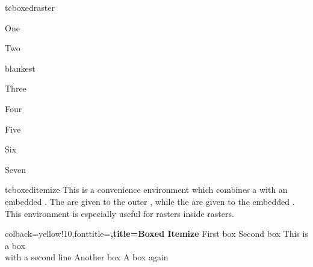 \begin{docEnvironment}[doc new=2016-02-19]{tcboxedraster}{}
\begin{dispExample}
\begin{tcbraster}[raster columns=2, raster equal height,
  raster every box/.style={size=small,colframe=red!50!black,colback=red!10!white,
    valign=center,halign=center}]
  \begin{tcolorbox}One\end{tcolorbox}
  \begin{tcolorbox}Two\end{tcolorbox}
    \begin{tcboxedraster}{blankest}
      \begin{tcolorbox}Three\end{tcolorbox}
      \begin{tcolorbox}Four\end{tcolorbox}
      \begin{tcolorbox}Five\end{tcolorbox}
      \begin{tcolorbox}Six\end{tcolorbox}
    \end{tcboxedraster}
    \begin{tcolorbox}Seven\end{tcolorbox}
\end{tcbraster}
\end{dispExample}
\end{docEnvironment}


\clearpage
\begin{docEnvironment}[doc new=2016-04-27]{tcboxeditemize}{}
  This is a convenience environment which combines a  with
  an embedded . The  are given to the
  outer , while the  are given to the
  embedded .
  This environment is especially useful for rasters inside rasters.

\begin{dispExample}
\begin{tcboxeditemize}[raster columns=3, raster equal height,
  size=small,colframe=red!50!black,colback=red!10!white,colbacktitle=red!50!white,
  title={Box \# \thetcbrasternum}]
  {colback=yellow!10,fonttitle=\bfseries,title=Boxed Itemize}
  \tcbitem First box
  \tcbitem Second box
  \tcbitem This is a box\\with a second line
  \tcbitem Another box
  \tcbitem A box again
\end{tcboxeditemize}
\end{dispExample}
\end{docEnvironment}


